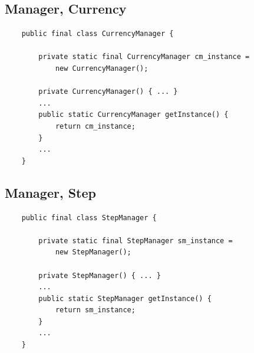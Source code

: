 \documentclass{article}
\begin{document}
\subsection{Manager, Currency}
\begin{verbatim}
    public final class CurrencyManager {
        
        private static final CurrencyManager cm_instance =
            new CurrencyManager();

        private CurrencyManager() { ... }
        ...
        public static CurrencyManager getInstance() {
            return cm_instance;
        }
        ...
    }
\end{verbatim}

\subsection{Manager, Step}
\begin{verbatim}
    public final class StepManager {
        
        private static final StepManager sm_instance =
            new StepManager();
            
        private StepManager() { ... }
        ...
        public static StepManager getInstance() {
            return sm_instance;
        }
        ...
    }
\end{verbatim}
\end{document}

